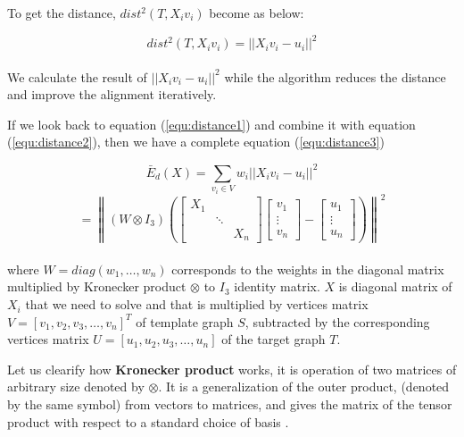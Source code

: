 \documentclass[../structure.tex]{subfiles}
\begin{document}
To get the distance, $dist^2(T,X_{i}v_{i})$ become as below:

\begin{equation}
dist^2(T,X_{i}v_{i}) = ||X_{i}v_{i}-u_{i}||^2
\label{equ:distance2}
\end{equation}\\

We calculate the result of $||X_{i}v_{i}-u_{i}||^2$ while the algorithm reduces the distance and improve the alignment iteratively.

If we look back to equation (\ref{equ:distance1}) and combine it with equation (\ref{equ:distance2}), then we have a complete equation (\ref{equ:distance3})

\begin{equation}
\bar{E}_{d}(X) = \sum_{v_{i}\in V} w_{i}||X_{i}v_{i}-u_{i}||^2
\label{equ:distance3}
\end{equation}
\begin{equation*}
= \left\|(W \otimes I_{3}) \left(
\begin{bmatrix}
X_{1} & & \\
& \ddots & \\
& & X_{n}
\end{bmatrix}
\begin{bmatrix}
v_{1} \\ \vdots \\ v_{n}
\end{bmatrix} -
\begin{bmatrix}
u_{1}\\ \vdots \\ u_{n}
\end{bmatrix}
\right) \right\|^2
\end{equation*}\\

where $W = diag(w_{1},\dots, w_{n})$ corresponds to the weights in the diagonal matrix multiplied by Kronecker product $\otimes$ to $I_{3}$ identity matrix. $X$ is diagonal matrix of $X_{i}$ that we need to solve and that is multiplied by vertices matrix $V=[v_{1},v_{2},v_{3}, \dots,v_{n}]^T$ of template graph $S$, subtracted by the corresponding vertices matrix $U=[u_{1},u_{2},u_{3}, \dots,u_{n}]$ of the target graph $T$.

Let us clearify how \textbf{Kronecker product} works, it is operation of two matrices of arbitrary size denoted by $\otimes$. It is a generalization of the outer product, (denoted by the same symbol) from vectors to matrices, and gives the matrix of the tensor product with respect to a standard choice of basis \cite{Wikipedia2019}.
\end{document}
